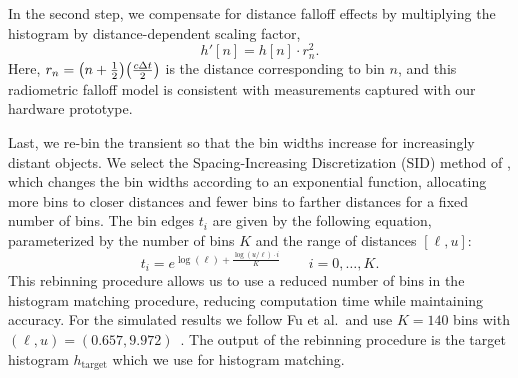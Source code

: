 In the second step, we compensate for distance falloff effects by multiplying the histogram
by distance-dependent scaling factor,
\begin{equation}
    h'[n] = h[n] \cdot r_n^2.
  \label{eq:h_scaled}
\end{equation}
Here, $r_n= \paren*{n + \frac12}\paren*{\frac{c\Delta t}{2}}$ is the distance
corresponding to bin $n$, and this radiometric falloff model is consistent with
measurements captured with our hardware prototype.

Last, we re-bin the transient so that the bin widths increase for increasingly
distant objects. We select the Spacing-Increasing Discretization
(SID) method of \cite{Fu2018}, which changes the bin widths according to an  
exponential function, allocating more bins to closer distances and fewer
bins to farther distances for a fixed number of bins. The bin edges $t_i$ are
given by the following equation,
parameterized by the number of bins $K$ and the range of distances $[\ell, u]$: 
\begin{equation}
  t_i = e^{\log(\ell) + \frac{\log(u/\ell) \cdot i}{K}}  \qquad i = 0,\ldots, K.
  \label{eq:sid_bin_edges}
\end{equation}
This rebinning procedure allows us to use a reduced number of bins in the histogram
matching procedure, reducing computation time while maintaining accuracy. For
the simulated results we follow Fu et al.\ and use $K = 140$ bins with $(\ell, u)
= (0.657, 9.972)$~\cite{Fu2018}. The output of the rebinning procedure is the
target histogram $h_\text{target}$ which we use for histogram matching. 



